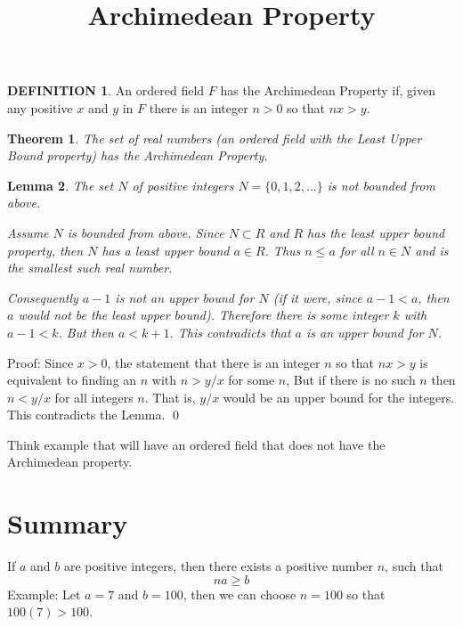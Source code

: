 \documentclass{article}
\theoremstyle{plain}
\newtheorem{thm}{Theorem}[section]
\newtheorem{lem}[thm]{Lemma}
\theoremstyle{definition}
\newtheorem*{defn}{DEFINITION}
\begin{document}
	\title{Archimedean Property}
	\maketitle
	\begin{defn}
		An ordered field $F$ has the Archimedean Property if, given any positive $x$ and
		$y$ in $F$ there is an integer $n>0$ so that $nx > y$.
	\end{defn}

	\begin{thm}
	The set of real numbers (an ordered field with the Least Upper Bound property)
	has the Archimedean Property.
	\end{thm}

\begin{lem}
	The set $N$ of positive integers $N =\{0, 1, 2, . . .\}$ is not bounded from above.
	
	Assume $N$ is bounded from above. Since $N\subset R$ and $R$ 	has the least upper bound property, then $N$ has a least upper bound $a\in R$. Thus $n\le a$ for all $n \in N$ and is the smallest such real number.
	
	Consequently $a-1$ is not an upper bound for $N$ (if it were, since $a-1<a$, then $a$ would
	not be the least upper bound). Therefore there is some integer $k$ with $a-1 < k$. But then
	$a < k + 1$. This contradicts that $a$ is an upper bound for $N$.
\end{lem}
	Proof: Since $x > 0$, the statement that there is an integer $n$ so that $nx > y$ is equivalent to finding an $n$ with $n > y/x$ for some $n$, But if there is no such $n$ then
	$n < y/x$ for all integers $n$. That is, $y/x$ would be an upper bound for the integers. This
	contradicts the Lemma.
	\qed

	Think example that will have an ordered field that does not have the Archimedean property.
\section*{Summary}
If $a$ and $b$ are positive integers, then there exists a positive number $n$, such that 
\[na \ge b\]
Example:  Let $a=7$ and $b=100$, then we can choose $n=100$ so that $100 (7) > 100$. 
\end{document}
